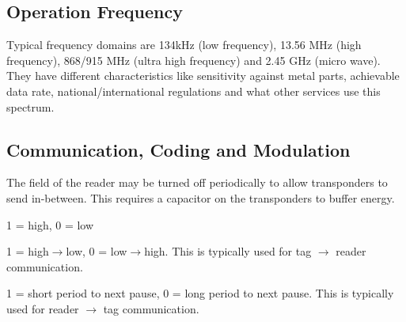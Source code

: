 \subsection{Operation Frequency}
\begin{mytitle} Typical frequency domains are 134kHz (low frequency), 13.56 MHz (high frequency), 868/915 MHz (ultra high frequency) and 2.45 GHz (micro wave). They have different characteristics like sensitivity against metal parts, achievable data rate, national/international regulations and what other services use this spectrum.
\end{mytitle}


\subsection{Communication, Coding and Modulation}
\begin{mytitle} The field of the reader may be turned off periodically to allow transponders to send in-between. This requires a capacitor on the transponders to buffer energy.
\end{mytitle}
\begin{mytitle} 
    \begin{mysubtitle}[NRZ] 1 = high, 0 = low
    \end{mysubtitle}
    \begin{mysubtitle}[Manchester] 1 = high$\to$low, 0 = low$\to$high. This is typically used for tag $\to$ reader communication.
    \end{mysubtitle}
    \begin{mysubtitle} 1 = short period to next pause, 0 = long period to next pause. This is typically used for reader $\to$ tag communication.
    \end{mysubtitle}
\end{mytitle}

